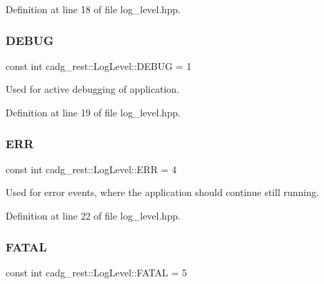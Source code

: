 Definition at line 18 of file log\+\_\+level.\+hpp.

\mbox{\label{structcadg__rest_1_1_log_level_a9d1ad5869bfdd4fed414b2dc5003c96d}} 
\subsubsection{\texorpdfstring{DEBUG}{DEBUG}}
{\footnotesize\ttfamily const int cadg\+\_\+rest\+::\+Log\+Level\+::\+D\+E\+B\+UG = 1\hspace{0.3cm}{\ttfamily [static]}}



Used for active debugging of application. 



Definition at line 19 of file log\+\_\+level.\+hpp.

\mbox{\label{structcadg__rest_1_1_log_level_a632f12b40200c49e53fd757f33939f2b}} 
\subsubsection{\texorpdfstring{ERR}{ERR}}
{\footnotesize\ttfamily const int cadg\+\_\+rest\+::\+Log\+Level\+::\+E\+RR = 4\hspace{0.3cm}{\ttfamily [static]}}



Used for error events, where the application should continue still running. 



Definition at line 22 of file log\+\_\+level.\+hpp.

\mbox{\label{structcadg__rest_1_1_log_level_a4449c46de023e43f20ee39150715957a}} 
\subsubsection{\texorpdfstring{FATAL}{FATAL}}
{\footnotesize\ttfamily const int cadg\+\_\+rest\+::\+Log\+Level\+::\+F\+A\+T\+AL = 5\hspace{0.3cm}{\ttfamily [static]}}



